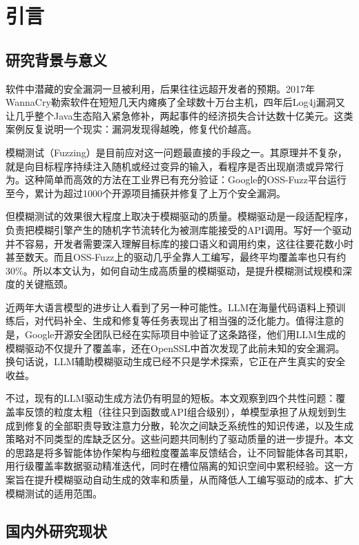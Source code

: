 \chapter{引言}

\section{研究背景与意义}

软件中潜藏的安全漏洞一旦被利用，后果往往远超开发者的预期。2017年WannaCry勒索软件在短短几天内瘫痪了全球数十万台主机，四年后Log4j漏洞又让几乎整个Java生态陷入紧急修补，两起事件的经济损失合计达数十亿美元\cite{chen2024}。这类案例反复说明一个现实：漏洞发现得越晚，修复代价越高。

模糊测试（Fuzzing）是目前应对这一问题最直接的手段之一。其原理并不复杂，就是向目标程序持续注入随机或经过变异的输入，看程序是否出现崩溃或异常行为\cite{li2024}。这种简单而高效的方法在工业界已有充分验证：Google的OSS-Fuzz平台运行至今，累计为超过1000个开源项目捕获并修复了上万个安全漏洞\cite{liu2023}。

但模糊测试的效果很大程度上取决于模糊驱动的质量。模糊驱动是一段适配程序，负责把模糊引擎产生的随机字节流转化为被测库能接受的API调用\cite{zhang2024}。写好一个驱动并不容易，开发者需要深入理解目标库的接口语义和调用约束，这往往要花数小时甚至数天\cite{lyu2024}。而且OSS-Fuzz上的驱动几乎全靠人工编写，最终平均覆盖率也只有约30\%\cite{liu2023}。所以本文认为，如何自动生成高质量的模糊驱动，是提升模糊测试规模和深度的关键瓶颈。

近两年大语言模型的进步让人看到了另一种可能性。LLM在海量代码语料上预训练后，对代码补全、生成和修复等任务表现出了相当强的泛化能力\cite{chen2021a}。值得注意的是，Google开源安全团队已经在实际项目中验证了这条路径，他们用LLM生成的模糊驱动不仅提升了覆盖率，还在OpenSSL中首次发现了此前未知的安全漏洞\cite{chang2024}。换句话说，LLM辅助模糊驱动生成已经不只是学术探索，它正在产生真实的安全收益。

不过，现有的LLM驱动生成方法仍有明显的短板。本文观察到四个共性问题：覆盖率反馈的粒度太粗（往往只到函数或API组合级别），单模型承担了从规划到生成到修复的全部职责导致注意力分散，轮次之间缺乏系统性的知识传递，以及生成策略对不同类型的库缺乏区分。这些问题共同制约了驱动质量的进一步提升。本文的思路是将多智能体协作架构与细粒度覆盖率反馈结合，让不同智能体各司其职，用行级覆盖率数据驱动精准迭代，同时在槽位隔离的知识空间中累积经验。这一方案旨在提升模糊驱动自动生成的效率和质量，从而降低人工编写驱动的成本、扩大模糊测试的适用范围。

\section{国内外研究现状}

